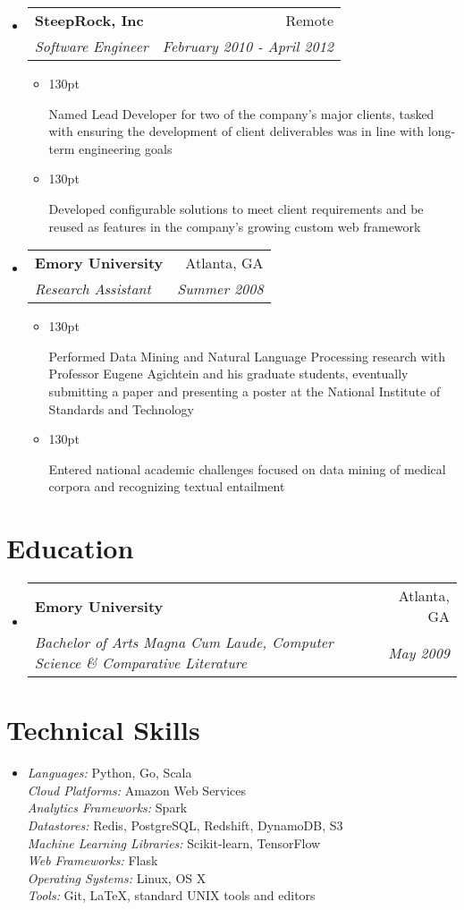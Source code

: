 \documentclass[letterpaper,10pt]{article}
\makeatletter
\newcommand{\resumeItem}[1]{
  \item{
    \begin{adjustwidth}{}{130pt}
    #1
    \end{adjustwidth}
  }
}
\newcommand{\resumeSubheading}[4]{
  \vspace{-1pt}\item[]
    \begin{tabular*}{0.97\textwidth}{l@{\extracolsep{\fill}}r}
      \textbf{#1} & #2 \\
      \textit{#3} & \textit{#4} \\
    \end{tabular*}\vspace{-5pt}
}
\makeatother
\begin{document}
\begin{itemize}[leftmargin=*]
    \resumeSubheading
      {SteepRock, Inc}
      {Remote}
      {Software Engineer}
      {February 2010 - April 2012}
    \begin{itemize}
      \resumeItem{
        Named Lead Developer for two of the company's major
        clients, tasked with ensuring the development of client
        deliverables was in line with long-term engineering goals
      }
      \resumeItem{
        Developed configurable solutions to meet client
        requirements and be reused as features in the company's
        growing custom web framework
      }
    \end{itemize}

    \resumeSubheading
      {Emory University}
      {Atlanta, GA}
      {Research Assistant}
      {Summer 2008}
    \begin{itemize}
      \resumeItem{
        Performed Data Mining and Natural Language Processing research
        with Professor Eugene Agichtein and his graduate students,
        eventually submitting a paper and presenting a poster at the National
        Institute of Standards and Technology
      }
      \resumeItem{
        Entered national academic challenges focused on data
        mining of medical corpora and recognizing textual entailment
      }
    \end{itemize}

  \end{itemize}

\section{Education}
  \begin{itemize}[leftmargin=*]
    \resumeSubheading
        {Emory University}
        {Atlanta, GA}
        {Bachelor of Arts Magna Cum Laude, Computer Science \& Comparative Literature}
        {May 2009}
  \end{itemize}

\section{Technical Skills}
  \begin{itemize}[leftmargin=*]
  \item[]
    \textit{Languages:} Python, Go, Scala \\
    \textit{Cloud Platforms:} Amazon Web Services\\
    \textit{Analytics Frameworks:} Spark \\
    \textit{Datastores:} Redis, PostgreSQL, Redshift, DynamoDB, S3 \\
    \textit{Machine Learning Libraries:} Scikit-learn, TensorFlow  \\
    \textit{Web Frameworks:} Flask \\
    \textit{Operating Systems:} Linux, OS X\\
    \textit{Tools:} Git, \LaTeX, standard UNIX tools and editors
  \end{itemize}
\end{document}
